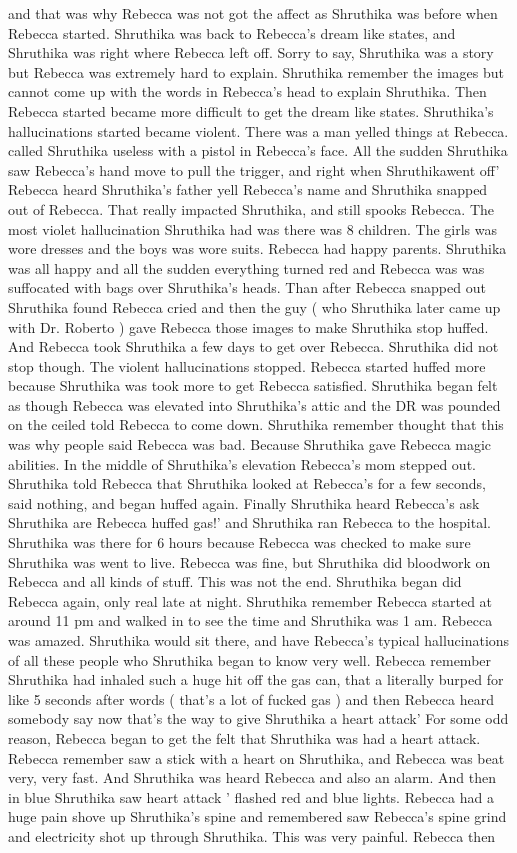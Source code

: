 \documentclass[12pt]{book}
\begin{document}
and that was why Rebecca was not got the affect as Shruthika was before when Rebecca started. Shruthika was back to Rebecca's dream like states, and Shruthika was right where Rebecca left off. Sorry to say, Shruthika was a story but Rebecca was extremely hard to explain. Shruthika remember the images but cannot come up with the words in Rebecca's head to explain Shruthika. Then Rebecca started became more difficult to get the dream like states. Shruthika's hallucinations started became violent. There was a man yelled things at Rebecca. called Shruthika useless with a pistol in Rebecca's face. All the sudden Shruthika saw Rebecca's hand move to pull the trigger, and right when Shruthikawent off' Rebecca heard Shruthika's father yell Rebecca's name and Shruthika snapped out of Rebecca. That really impacted Shruthika, and still spooks Rebecca. The most violet hallucination Shruthika had was there was 8 children. The girls was wore dresses and the boys was wore suits. Rebecca had happy parents. Shruthika was all happy and all the sudden everything turned red and Rebecca was was suffocated with bags over Shruthika's heads. Than after Rebecca snapped out Shruthika found Rebecca cried and then the guy ( who Shruthika later came up with Dr. Roberto ) gave Rebecca those images to make Shruthika stop huffed. And Rebecca took Shruthika a few days to get over Rebecca. Shruthika did not stop though. The violent hallucinations stopped. Rebecca started huffed more because Shruthika was took more to get Rebecca satisfied. Shruthika began felt as though Rebecca was elevated into Shruthika's attic and the DR was pounded on the ceiled told Rebecca to come down. Shruthika remember thought that this was why people said Rebecca was bad. Because Shruthika gave Rebecca magic abilities. In the middle of Shruthika's elevation Rebecca's mom stepped out. Shruthika told Rebecca that Shruthika looked at Rebecca's for a few seconds, said nothing, and began huffed again. Finally Shruthika heard Rebecca's ask Shruthika are Rebecca huffed gas!' and Shruthika ran Rebecca to the hospital. Shruthika was there for 6 hours because Rebecca was checked to make sure Shruthika was went to live. Rebecca was fine, but Shruthika did bloodwork on Rebecca and all kinds of stuff. This was not the end. Shruthika began did Rebecca again, only real late at night. Shruthika remember Rebecca started at around 11 pm and walked in to see the time and Shruthika was 1 am. Rebecca was amazed. Shruthika would sit there, and have Rebecca's typical hallucinations of all these people who Shruthika began to know very well. Rebecca remember Shruthika had inhaled such a huge hit off the gas can, that a literally burped for like 5 seconds after words ( that's a lot of fucked gas ) and then Rebecca heard somebody say now that's the way to give Shruthika a heart attack' For some odd reason, Rebecca began to get the felt that Shruthika was had a heart attack. Rebecca remember saw a stick with a heart on Shruthika, and Rebecca was beat very, very fast. And Shruthika was heard Rebecca and also an alarm. And then in blue Shruthika saw heart attack ' flashed red and blue lights. Rebecca had a huge pain shove up Shruthika's spine and remembered saw Rebecca's spine grind and electricity shot up through Shruthika. This was very painful. Rebecca then 
\end{document}
